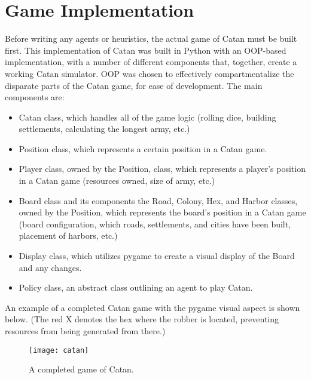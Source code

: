 \documentclass[a4paper, 11pt]{article}
\begin{document}
\section{Game Implementation}
Before writing any agents or heuristics, the actual game of Catan must be built first. This implementation of Catan was built in Python with an OOP-based implementation, with a number of different components that, together, create a working Catan simulator. OOP was chosen to effectively compartmentalize the disparate parts of the Catan game, for ease of development. The main components are:
\begin{itemize}
	\item Catan class, which handles all of the game logic (rolling dice, building settlements, calculating the longest army, etc.)
	\item Position class, which represents a certain position in a Catan game.
	\item Player class, owned by the Position, class, which represents a player's position in a Catan game (resources owned, size of army, etc.)
	\item Board class and its components the Road, Colony, Hex, and Harbor classes, owned by the Position, which represents the board's position in a Catan game (board configuration, which roads, settlements, and cities have been built, placement of harbors, etc.)
	\item Display class, which utilizes pygame to create a visual display of the Board and any changes.
	\item Policy class, an abstract class outlining an agent to play Catan.
\end{itemize}

\noindent An example of a completed Catan game with the pygame visual aspect is shown below. (The red X denotes the hex where the robber is located, preventing resources from being generated from there.)

\begin{figure}[!h]
  \caption{A completed game of Catan.}
  \begin{center}
    \texttt{[image: catan]}
  \end{center}
\end{figure}
\end{document}
